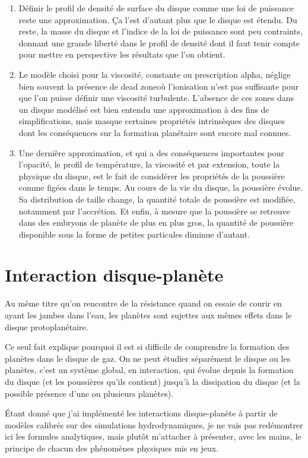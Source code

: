 \begin{enumerate}
\item Définir le profil de densité de surface du disque comme une loi de puissance reste une approximation. Ça l'est d'autant plus que le disque est étendu. Du reste, la masse du disque et l'indice de la loi de puissance sont peu contraints, donnant une grande liberté dans le profil de densité dont il faut tenir compte pour mettre en perspective les résultats que l'on obtient.
\item Le modèle choisi pour la viscosité, constante ou prescription alpha, néglige bien souvent la présence de \og dead zone\fg où l'ionisation n'est pas suffisante pour que l'on puisse définir une viscosité turbulente. L'absence de ces zones dans un disque modélisé est bien entendu une approximation à des fins de simplifications, mais masque certaines propriétés intrinsèques des disques dont les conséquences sur la formation planétaire sont encore mal connues.
\item Une dernière approximation, et qui a des conséquences importantes pour l'opacité, le profil de température, la viscosité et par extension, toute la physique du disque, est le fait de considérer les propriétés de la poussière comme figées dans le temps. Au cours de la vie du disque, la poussière évolue. Sa distribution de taille change, la quantité totale de poussière est modifiée, notamment par l'accrétion. Et enfin, à mesure que la poussière se retrouve dans des embryons de planète de plus en plus gros, la quantité de poussière disponible sous la forme de petites particules diminue d'autant. 
\end{enumerate}

\section{Interaction disque-planète}
Au même titre qu'on rencontre de la résistance quand on essaie de courir en ayant les jambes dans l'eau, les planètes sont sujettes aux mêmes effets dans le disque protoplanétaire. 

Ce seul fait explique pourquoi il est si difficile de comprendre la formation des planètes dans le disque de gaz. On ne peut étudier séparément le disque ou les planètes, c'est un système global, en interaction, qui évolue depuis la formation du disque (et les poussières qu'ils contient) jusqu'à la dissipation du disque (et la possible présence d'une ou plusieurs planètes).

Étant donné que j'ai implémenté les interactions disque-planète à partir de modèles calibrés sur des simulations hydrodynamiques, je ne vais pas redémontrer ici les formules analytiques, mais plutôt m'attacher à présenter, avec les mains, le principe de chacun des phénomènes physiques mis en jeux.


